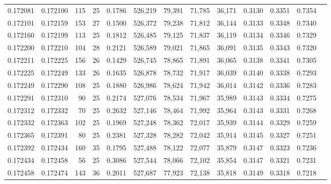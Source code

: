\begin{tabular}{rrrrrrrrrrrrr}
0.172081 & 0.172100 & 115 &  25 &                                     0.1786 & 526,219 &  79,391 &  71,785 &  36,171 & 0.3130 & 0.3351 & 0.7354 \\
0.172101 & 0.172159 & 153 &  27 &                                     0.1500 & 526,372 &  79,238 &  71,812 &  36,144 & 0.3133 & 0.3348 & 0.7340 \\
0.172160 & 0.172199 & 113 &  25 &                                     0.1812 & 526,485 &  79,125 &  71,837 &  36,119 & 0.3134 & 0.3346 & 0.7329 \\
0.172200 & 0.172210 & 104 &  28 &                                     0.2121 & 526,589 &  79,021 &  71,865 &  36,091 & 0.3135 & 0.3343 & 0.7320 \\
0.172211 & 0.172225 & 156 &  26 &                                     0.1429 & 526,745 &  78,865 &  71,891 &  36,065 & 0.3138 & 0.3341 & 0.7305 \\
0.172225 & 0.172249 & 133 &  26 &                                     0.1635 & 526,878 &  78,732 &  71,917 &  36,039 & 0.3140 & 0.3338 & 0.7293 \\
0.172249 & 0.172290 & 108 &  25 &                                     0.1880 & 526,986 &  78,624 &  71,942 &  36,014 & 0.3142 & 0.3336 & 0.7283 \\
0.172291 & 0.172310 &  90 &  25 &                                     0.2174 & 527,076 &  78,534 &  71,967 &  35,989 & 0.3143 & 0.3334 & 0.7275 \\
0.172312 & 0.172332 &  70 &  25 &                                     0.2632 & 527,146 &  78,464 &  71,992 &  35,964 & 0.3143 & 0.3331 & 0.7268 \\
0.172332 & 0.172363 & 102 &  25 &                                     0.1969 & 527,248 &  78,362 &  72,017 &  35,939 & 0.3144 & 0.3329 & 0.7259 \\
0.172365 & 0.172391 &  80 &  25 &                                     0.2381 & 527,328 &  78,282 &  72,042 &  35,914 & 0.3145 & 0.3327 & 0.7251 \\
0.172392 & 0.172434 & 160 &  35 &                                     0.1795 & 527,488 &  78,122 &  72,077 &  35,879 & 0.3147 & 0.3323 & 0.7236 \\
0.172434 & 0.172458 &  56 &  25 &                                     0.3086 & 527,544 &  78,066 &  72,102 &  35,854 & 0.3147 & 0.3321 & 0.7231 \\
0.172458 & 0.172474 & 143 &  36 &                                     0.2011 & 527,687 &  77,923 &  72,138 &  35,818 & 0.3149 & 0.3318 & 0.7218 \\

\end{tabular}
